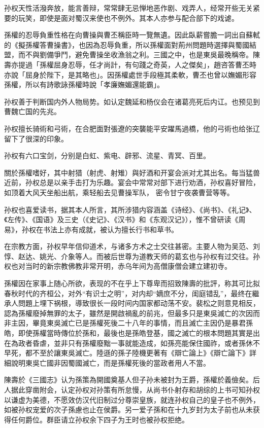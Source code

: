 孙权天性活潑奔放，能言善辩，常常肆无忌惮地恶作剧、戏弄人，经常开些无关紧要的玩笑，即使是面对蜀汉来使也不例外。其本人亦参与配合部下的戏谑。

孫權的忍辱負重性格在向曹操與曹丕稱臣時一覽無遺。因此臥薪嘗膽一詞出自蘇軾的《擬孫權答曹操書》，也因為忍辱負重，所以孫權面對荊州問題時選擇與蜀國結盟，而不與劉備爭鬥，避免曹操坐收漁翁之利。三國之中，也是東吳最晚稱帝。陳壽亦提過「孫權屈身忍辱，任才尚計，有句踐之奇英，人之傑矣」，趙咨答曹丕時亦說「屈身於陛下，是其略也」。因孫權處世手段極其柔軟，曹丕也曾以嫵媚形容孫權，所以有詩歌詠孫權時說「孝廉嫵媚還能霸」。

孙权善于判断国内外人物局势。如认定魏延和杨仪会在诸葛亮死后内讧。也预见到曹魏亡国的先兆。

孙权擅长骑術和弓術，在合肥面對張遼的突襲能平安躍馬過橋，他的弓術也给张辽留下了很深的印象。

孙权有六口宝剑，分别是白虹、紫电、辟邪、流星、青冥、百里。

關於孫權嗜好，其中射猎（射虎、射雉）與好酒和开宴会派对尤其出名。每当猛兽近前，孙权总是以亲手击打为乐趣。宴会中常常对部下进行劝酒，孙权喜好冒险，如顶着大风天坐船出航，乘轻船去见曹操军队， 密令甘宁夜袭曹营等等。

孙权也喜爱读书，据其本人所言，其所涉猎内容涵盖《诗经》、《尚书》、《礼记》、《左传》、《国语》及三史（《史记》、《汉书》和《东观汉记》），惟不曾研读《周易》，孙权在书法上亦有成就，被认为擅长行书和草书。

在宗教方面，孙权早年信仰道术，与诸多方术之士交往甚密。主要人物为吴范、刘惇、赵达、姚光、介象等人。而被后世尊为道教天师的葛玄也与孙权有过交往。孙权也对当时的新宗教佛教非常开明，赤乌年间为高僧康僧会建立建初寺。

孫權因在家事上随心所欲，表现的不在乎上下尊卑而招致陳壽的批評，称其可比拟春秋时代的齐桓公，对外“有识士之明”，对内却“嫡庶不分，闺庭错乱”，最终在繼承人問題上埋下祸根，導致很长一段时间内国家都动荡不安。裴松之则意見相反，認為孫權廢掉無罪的太子，雖然是開啟禍亂的前兆，但最多只是東吳滅亡的次因而非主因，畢竟東吳滅亡已是孫權死後二十八年的事情，而且滅亡主因仍是暴君孫皓，即使孫權當時傳位於孫和，最後也是孫皓登基，國之滅亡的根本問題其實是出在為政者昏虐，並非只有孫權廢黜一事就能造成，如孫亮能保住國祚，或者孫休不早死，都不至於讓東吳滅亡。陸遜的孫子陸機更著有《辯亡論上》《辯亡論下》詳細說明東吳亡國非因蜀國滅亡，而是孫權死後的當政者用人不當。

陳壽於《三國志》认为孫策為開國奠基人但子孙未被封为王爵，孫權於義儉矣。后人据此穿凿附会，认定孙权对孙策有所怠慢，从尚书仆射存和胡综的上书可知孙权以谦虚为美德，不愿效仿汉代旧制过分尊崇皇族，就连孙权自己的皇子也不例外，如被孙权宠爱的次子孫慮也止在侯爵。另一爱子孫和在十九岁封为太子前也从未获得任何爵位。群臣请立孙权余下四子为王时也被孙权拒绝。

